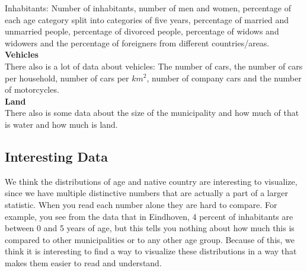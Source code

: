 Inhabitants: Number of inhabitants, number of men and women, percentage of each age category split into categories of five years, percentage of married and unmarried people, percentage of divorced people, percentage of widows and widowers and the percentage of foreigners from different countries/areas. \\
 \textbf{Vehicles} \\
 There also is a lot of data about vehicles: The number of cars, the number of cars per household, number of cars per $km^{2}$, number of company cars and the number of motorcycles. \\
  \textbf{Land} \\
There also is some data about the size of the municipality and how much of that is water and how much is land. \\
\subsection{Interesting Data}
We think the distributions of age and native country are interesting to visualize, since we have multiple distinctive numbers that are actually a part of a larger statistic.
When you read each number alone they are hard to compare.
For example, you see from the data that in Eindhoven, 4 percent of inhabitants are between 0 and 5 years of age, but this tells you nothing about how much this is compared to other municipalities or to any other age group.
Because of this, we think it is interesting to find a way to visualize these distributions in a way that makes them easier to read and understand.
